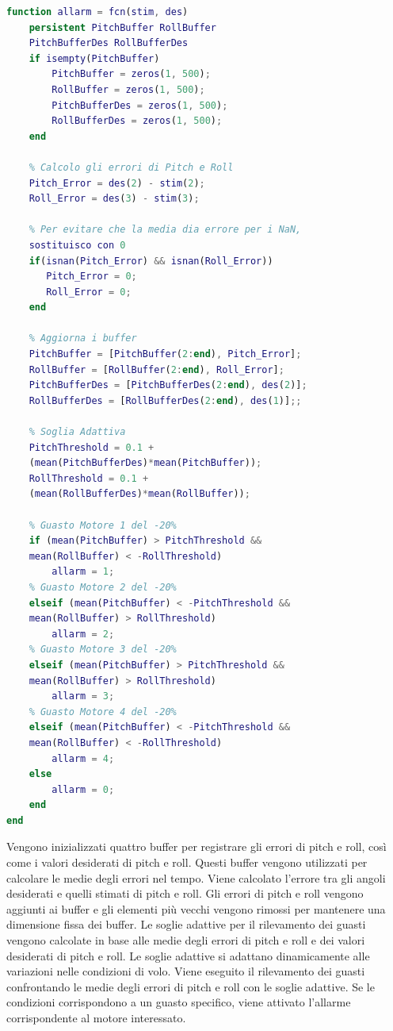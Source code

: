 \begin{lstlisting}[language=Matlab, caption={Descrizione del codice}, label={lst:codice_matlab}]
function allarm = fcn(stim, des)
    persistent PitchBuffer RollBuffer 
    PitchBufferDes RollBufferDes
    if isempty(PitchBuffer)
        PitchBuffer = zeros(1, 500);
        RollBuffer = zeros(1, 500);
        PitchBufferDes = zeros(1, 500);
        RollBufferDes = zeros(1, 500);
    end

    % Calcolo gli errori di Pitch e Roll
    Pitch_Error = des(2) - stim(2);
    Roll_Error = des(3) - stim(3);

    % Per evitare che la media dia errore per i NaN, 
    sostituisco con 0
    if(isnan(Pitch_Error) && isnan(Roll_Error))
       Pitch_Error = 0;
       Roll_Error = 0;
    end

    % Aggiorna i buffer
    PitchBuffer = [PitchBuffer(2:end), Pitch_Error];
    RollBuffer = [RollBuffer(2:end), Roll_Error];
    PitchBufferDes = [PitchBufferDes(2:end), des(2)];
    RollBufferDes = [RollBufferDes(2:end), des(1)];;

    % Soglia Adattiva 
    PitchThreshold = 0.1 + 
    (mean(PitchBufferDes)*mean(PitchBuffer));
    RollThreshold = 0.1 + 
    (mean(RollBufferDes)*mean(RollBuffer));

    % Guasto Motore 1 del -20%
    if (mean(PitchBuffer) > PitchThreshold && 
    mean(RollBuffer) < -RollThreshold)
        allarm = 1;
    % Guasto Motore 2 del -20%
    elseif (mean(PitchBuffer) < -PitchThreshold && 
    mean(RollBuffer) > RollThreshold)
        allarm = 2;
    % Guasto Motore 3 del -20%
    elseif (mean(PitchBuffer) > PitchThreshold && 
    mean(RollBuffer) > RollThreshold)
        allarm = 3;
    % Guasto Motore 4 del -20%
    elseif (mean(PitchBuffer) < -PitchThreshold && 
    mean(RollBuffer) < -RollThreshold)
        allarm = 4;
    else
        allarm = 0;
    end
end
\end{lstlisting}
\noindent
Vengono inizializzati quattro buffer per registrare gli errori di pitch e roll, così come i valori desiderati di pitch e roll. Questi buffer vengono utilizzati per calcolare le medie degli errori nel tempo. Viene calcolato l'errore tra gli angoli desiderati e quelli stimati di pitch e roll. Gli errori di pitch e roll vengono aggiunti ai buffer e gli elementi più vecchi vengono rimossi per mantenere una dimensione fissa dei buffer. Le soglie adattive per il rilevamento dei guasti vengono calcolate in base alle medie degli errori di pitch e roll e dei valori desiderati di pitch e roll. Le soglie adattive si adattano dinamicamente alle variazioni nelle condizioni di volo. Viene eseguito il rilevamento dei guasti confrontando le medie degli errori di pitch e roll con le soglie adattive. Se le condizioni corrispondono a un guasto specifico, viene attivato l'allarme corrispondente al motore interessato.
